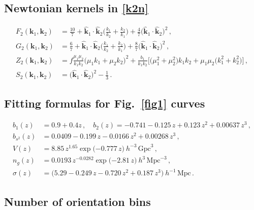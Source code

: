 \subsection*{Newtonian kernels in \eqref{k2n}}
\begin{align}
F_{2}(\bm{k}_{1}, \bm{k}_{2}) &= \frac{10}{7} + {\hat{\bm{k}}_{1} \cdot \hat{\bm{k}}_2}\bigg(\frac{k_{1}}{k_{2}} + \frac{k_{2}}{k_{1}}\bigg) + \frac{4}{7}\big({\hat{\bm{k}}_{1} \cdot \hat{\bm{k}}_2}\big)^{2}\,,
\label{e18} \\
G_{2}(\bm{k}_{1}, \bm{k}_{2}) &= \frac{6}{7} + {\hat{\bm{k}}_{1} \cdot \hat{\bm{k}}_2}\bigg(\frac{k_{1}}{k_{2}} + \frac{k_{2}}{k_{1}}\bigg) + \frac{8}{7}\big({\hat{\bm{k}}_{1} \cdot \hat{\bm{k}}_2}\big)^{2} \label{e19}\,,\\
Z_2(\bm{k}_1,\bm{k}_2) &=
 f \frac{\mu_1\mu_2}{k_1k_2}\big( \mu_1k_1+\mu_2k_2\big)^2 
+ \frac{b_{1}}{k_1k_2}\Big[ \big(\mu_1^2+\mu_2^2 \big)k_1k_2+\mu_1\mu_2\big(k_1^2+k_2^2 \big) \Big]\,, \label{e16x} \\  
S_{2}(\bm{k}_{1}, \bm{k}_{2}) &= \big({\hat{\bm{k}}_{1} \cdot \hat{\bm{k}}_2}\big)^{2} - \frac{1}{3}\,. \label{e20}
\end{align}

\subsection*{Fitting formulas for Fig.~\ref{fig1} curves}
\begin{align}
b_1(z) &= 0.9+0.4 z\,, \quad b_2(z) = -0.741 - 0.125\,z + 0.123\,z^{2} + 0.00637\,z^{3}\,, \label{e9}  \\
 b_{s^2}(z) &= 0.0409 - 0.199\,z - 0.0166\,z^{2} + 0.00268\,z^{3} \,, \label{e11} \\
 V(z) &= 8.85\, z^{1.65}\exp\big({-0.777\,z}\big)~ h^{-3}\,\mathrm{Gpc}^{3}\,, \label{e11_1} \\
n_{g}(z) &= 0.0193\, z^{-0.0282}\exp\big({-2.81\,z}\big) ~h^{3}\,\mathrm{Mpc}^{-3}\,,
 \label{e11_2}\\
\sigma(z)& = \big(5.29 - 0.249\,z - 0.720\,z^{2} + 0.187\,z^{3}\big)~h^{-1}\,\mathrm{Mpc}\,. \label{e14a}
\end{align}


\subsection*{{Number of orientation bins}}


